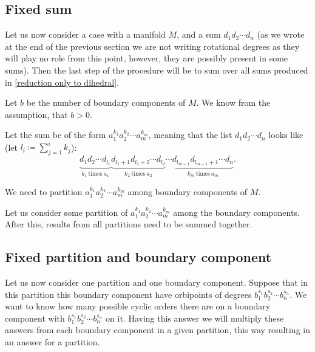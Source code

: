 \subsection{Fixed sum}

Let us now consider a case with a manifold $M$, and a sum $d_1d_2\cdots d_n$ (as we wrote 
at the end of the previous section we are not writing rotational degrees as 
they will play no role from this point, however, they are possibly present in some sums). 
Then the last step of the procedure will be to sum over all sums produced in 
\ref{reduction only to dihedral}. 



Let $b$ be the number of boundary components of $M$. We know from the assumption, that $b > 0$. 

Let the sum be of the form $a_1^{k_1}a_2^{k_2}\cdots a_m^{k_m}$, meaning that the 
list $d_1d_2\cdots d_n$ looks like (let $l_i \coloneqq \sum_{j = 1}^i k_j$):
\begin{equation}
\underbrace{d_1d_2\cdots d_{l_1}}_{k_1\ \mathrm{times}\ a_1} 
\underbrace{d_{l_1+1}d_{l_1+2}\cdots d_{l_2}}_{k_2\ \mathrm{times}\ a_2} \cdots 
\underbrace{d_{l_{m-1}}d_{l_{m-1}+1}\cdots d_n}_{k_m\ \mathrm{times}\ a_m}. 
\end{equation}

We need to partition $a_1^{k_1}a_2^{k_2}\cdots a_m^{k_m}$ among boundary 
components of $M$. 


Let us consider some partition of $a_1^{k_1}a_2^{k_2}\cdots a_m^{k_m}$ among the boundary 
components. After this, results from all partitions need to be summed together. 



\subsection{Fixed partition and boundary component}
Let us now consider one partition and one boundary component. 
Suppose that in this partition this boundary component have orbipoints of degrees 
$b_1^{s_1}b_2^{s_2}\cdots b_n^{s_n}$.  
We want to know how many possible cyclic orders there are on a boundary component with 
$b_1^{s_1}b_2^{s_2}\cdots b_n^{s_n}$ on it. 
Having this answer we will multiply these answers from each boundary component in 
a given partition, this way resulting in an answer for a partition. 

